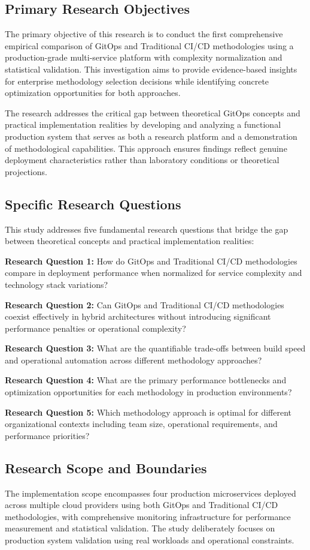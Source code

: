 \subsection{Primary Research Objectives}
The primary objective of this research is to conduct the first comprehensive empirical comparison of GitOps and Traditional CI/CD methodologies using a production-grade multi-service platform with complexity normalization and statistical validation. This investigation aims to provide evidence-based insights for enterprise methodology selection decisions while identifying concrete optimization opportunities for both approaches.

The research addresses the critical gap between theoretical GitOps concepts and practical implementation realities by developing and analyzing a functional production system that serves as both a research platform and a demonstration of methodological capabilities. This approach ensures findings reflect genuine deployment characteristics rather than laboratory conditions or theoretical projections.

\subsection{Specific Research Questions}
This study addresses five fundamental research questions that bridge the gap between theoretical concepts and practical implementation realities:

\textbf{Research Question 1:} How do GitOps and Traditional CI/CD methodologies compare in deployment performance when normalized for service complexity and technology stack variations?

\textbf{Research Question 2:} Can GitOps and Traditional CI/CD methodologies coexist effectively in hybrid architectures without introducing significant performance penalties or operational complexity?

\textbf{Research Question 3:} What are the quantifiable trade-offs between build speed and operational automation across different methodology approaches?

\textbf{Research Question 4:} What are the primary performance bottlenecks and optimization opportunities for each methodology in production environments?

\textbf{Research Question 5:} Which methodology approach is optimal for different organizational contexts including team size, operational requirements, and performance priorities?

\subsection{Research Scope and Boundaries}
The implementation scope encompasses four production microservices deployed across multiple cloud providers using both GitOps and Traditional CI/CD methodologies, with comprehensive monitoring infrastructure for performance measurement and statistical validation. The study deliberately focuses on production system validation using real workloads and operational constraints.

